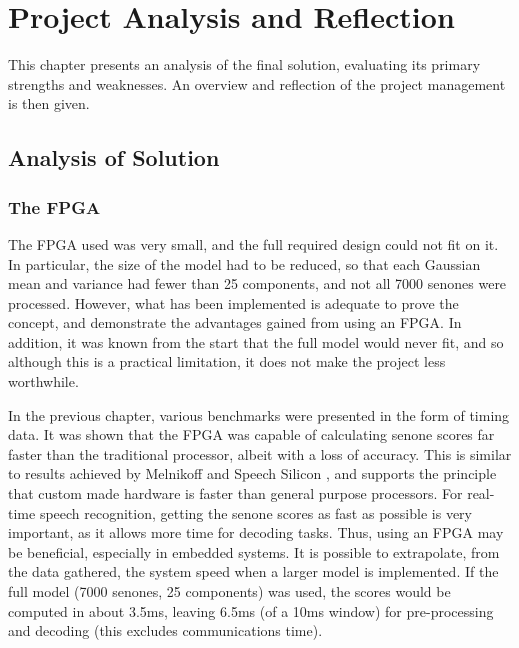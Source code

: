 \chapter{Project Analysis and Reflection} %
\label{cha:project_analysis}

This chapter presents an analysis of the final solution, evaluating its primary strengths and weaknesses.  An overview and reflection of the project management is then given.

\section{Analysis of Solution} %
\label{sec:analysis_of_solution}

	\subsection{The FPGA} %
	\label{sub:analysis_the_fpga}
		The FPGA used was very small, and the full required design could not fit on it.  In particular, the size of the model had to be reduced, so that each Gaussian mean and variance had fewer than 25 components, and not all 7000 senones were processed.  However, what has been implemented is adequate to prove the concept, and demonstrate the advantages gained from using an FPGA.  In addition, it was known from the start that the full model would never fit, and so although this is a practical limitation, it does not make the project less worthwhile.

		In the previous chapter, various benchmarks were presented in the form of timing data.  It was shown that the FPGA was capable of calculating senone scores far faster than the traditional processor, albeit with a loss of accuracy.  This is similar to results achieved by Melnikoff \cite{melnikoff2003speech} and Speech Silicon \cite{schuster2006speech}, and supports the principle that custom made hardware is faster than general purpose processors.  For real-time speech recognition, getting the senone scores as fast as possible is very important, as it allows more time for decoding tasks.  Thus, using an FPGA may be beneficial, especially in embedded systems.  It is possible to extrapolate, from the data gathered, the system speed when a larger model is implemented.  If the full model (7000 senones, 25 components) was used, the scores would be computed in about 3.5ms, leaving 6.5ms (of a 10ms window) for pre-processing and decoding (this excludes communications time).


